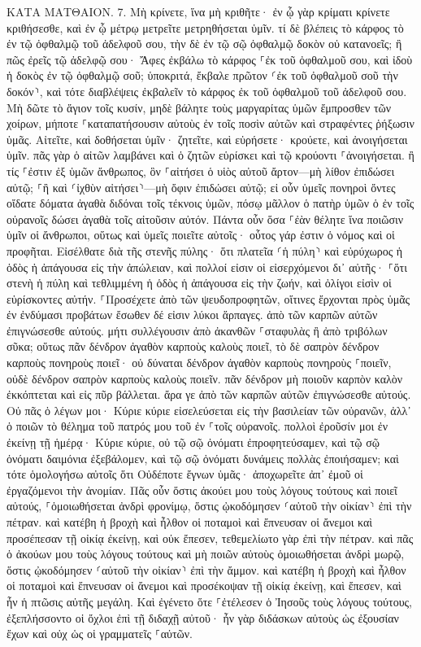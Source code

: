 \documentclass[twoside, 9pt]{extreport}
\begin{document}
ΚΑΤΑ ΜΑΤΘΑΙΟΝ.
7.
Μὴ κρίνετε, ἵνα μὴ κριθῆτε· 
ἐν ᾧ γὰρ κρίματι κρίνετε κριθήσεσθε, καὶ ἐν ᾧ μέτρῳ μετρεῖτε μετρηθήσεται ὑμῖν. 
τί δὲ βλέπεις τὸ κάρφος τὸ ἐν τῷ ὀφθαλμῷ τοῦ ἀδελφοῦ σου, τὴν δὲ ἐν τῷ σῷ ὀφθαλμῷ δοκὸν οὐ κατανοεῖς; 
ἢ πῶς ἐρεῖς τῷ ἀδελφῷ σου· Ἄφες ἐκβάλω τὸ κάρφος ⸀ἐκ τοῦ ὀφθαλμοῦ σου, καὶ ἰδοὺ ἡ δοκὸς ἐν τῷ ὀφθαλμῷ σοῦ; 
ὑποκριτά, ἔκβαλε πρῶτον ⸂ἐκ τοῦ ὀφθαλμοῦ σοῦ τὴν δοκόν⸃, καὶ τότε διαβλέψεις ἐκβαλεῖν τὸ κάρφος ἐκ τοῦ ὀφθαλμοῦ τοῦ ἀδελφοῦ σου. 
Μὴ δῶτε τὸ ἅγιον τοῖς κυσίν, μηδὲ βάλητε τοὺς μαργαρίτας ὑμῶν ἔμπροσθεν τῶν χοίρων, μήποτε ⸀καταπατήσουσιν αὐτοὺς ἐν τοῖς ποσὶν αὐτῶν καὶ στραφέντες ῥήξωσιν ὑμᾶς. 
Αἰτεῖτε, καὶ δοθήσεται ὑμῖν· ζητεῖτε, καὶ εὑρήσετε· κρούετε, καὶ ἀνοιγήσεται ὑμῖν. 
πᾶς γὰρ ὁ αἰτῶν λαμβάνει καὶ ὁ ζητῶν εὑρίσκει καὶ τῷ κρούοντι ⸀ἀνοιγήσεται. 
ἢ τίς ⸀ἐστιν ἐξ ὑμῶν ἄνθρωπος, ὃν ⸀αἰτήσει ὁ υἱὸς αὐτοῦ ἄρτον—μὴ λίθον ἐπιδώσει αὐτῷ; 
⸀ἢ καὶ ⸂ἰχθὺν αἰτήσει⸃—μὴ ὄφιν ἐπιδώσει αὐτῷ; 
εἰ οὖν ὑμεῖς πονηροὶ ὄντες οἴδατε δόματα ἀγαθὰ διδόναι τοῖς τέκνοις ὑμῶν, πόσῳ μᾶλλον ὁ πατὴρ ὑμῶν ὁ ἐν τοῖς οὐρανοῖς δώσει ἀγαθὰ τοῖς αἰτοῦσιν αὐτόν. 
Πάντα οὖν ὅσα ⸀ἐὰν θέλητε ἵνα ποιῶσιν ὑμῖν οἱ ἄνθρωποι, οὕτως καὶ ὑμεῖς ποιεῖτε αὐτοῖς· οὗτος γάρ ἐστιν ὁ νόμος καὶ οἱ προφῆται. 
Εἰσέλθατε διὰ τῆς στενῆς πύλης· ὅτι πλατεῖα ⸂ἡ πύλη⸃ καὶ εὐρύχωρος ἡ ὁδὸς ἡ ἀπάγουσα εἰς τὴν ἀπώλειαν, καὶ πολλοί εἰσιν οἱ εἰσερχόμενοι δι᾽ αὐτῆς· 
⸀ὅτι στενὴ ἡ πύλη καὶ τεθλιμμένη ἡ ὁδὸς ἡ ἀπάγουσα εἰς τὴν ζωήν, καὶ ὀλίγοι εἰσὶν οἱ εὑρίσκοντες αὐτήν. 
⸀Προσέχετε ἀπὸ τῶν ψευδοπροφητῶν, οἵτινες ἔρχονται πρὸς ὑμᾶς ἐν ἐνδύμασι προβάτων ἔσωθεν δέ εἰσιν λύκοι ἅρπαγες. 
ἀπὸ τῶν καρπῶν αὐτῶν ἐπιγνώσεσθε αὐτούς. μήτι συλλέγουσιν ἀπὸ ἀκανθῶν ⸀σταφυλὰς ἢ ἀπὸ τριβόλων σῦκα; 
οὕτως πᾶν δένδρον ἀγαθὸν καρποὺς καλοὺς ποιεῖ, τὸ δὲ σαπρὸν δένδρον καρποὺς πονηροὺς ποιεῖ· 
οὐ δύναται δένδρον ἀγαθὸν καρποὺς πονηροὺς ⸀ποιεῖν, οὐδὲ δένδρον σαπρὸν καρποὺς καλοὺς ποιεῖν. 
πᾶν δένδρον μὴ ποιοῦν καρπὸν καλὸν ἐκκόπτεται καὶ εἰς πῦρ βάλλεται. 
ἄρα γε ἀπὸ τῶν καρπῶν αὐτῶν ἐπιγνώσεσθε αὐτούς. 
Οὐ πᾶς ὁ λέγων μοι· Κύριε κύριε εἰσελεύσεται εἰς τὴν βασιλείαν τῶν οὐρανῶν, ἀλλ᾽ ὁ ποιῶν τὸ θέλημα τοῦ πατρός μου τοῦ ἐν ⸀τοῖς οὐρανοῖς. 
πολλοὶ ἐροῦσίν μοι ἐν ἐκείνῃ τῇ ἡμέρᾳ· Κύριε κύριε, οὐ τῷ σῷ ὀνόματι ἐπροφητεύσαμεν, καὶ τῷ σῷ ὀνόματι δαιμόνια ἐξεβάλομεν, καὶ τῷ σῷ ὀνόματι δυνάμεις πολλὰς ἐποιήσαμεν; 
καὶ τότε ὁμολογήσω αὐτοῖς ὅτι Οὐδέποτε ἔγνων ὑμᾶς· ἀποχωρεῖτε ἀπ᾽ ἐμοῦ οἱ ἐργαζόμενοι τὴν ἀνομίαν. 
Πᾶς οὖν ὅστις ἀκούει μου τοὺς λόγους τούτους καὶ ποιεῖ αὐτούς, ⸀ὁμοιωθήσεται ἀνδρὶ φρονίμῳ, ὅστις ᾠκοδόμησεν ⸂αὐτοῦ τὴν οἰκίαν⸃ ἐπὶ τὴν πέτραν. 
καὶ κατέβη ἡ βροχὴ καὶ ἦλθον οἱ ποταμοὶ καὶ ἔπνευσαν οἱ ἄνεμοι καὶ προσέπεσαν τῇ οἰκίᾳ ἐκείνῃ, καὶ οὐκ ἔπεσεν, τεθεμελίωτο γὰρ ἐπὶ τὴν πέτραν. 
καὶ πᾶς ὁ ἀκούων μου τοὺς λόγους τούτους καὶ μὴ ποιῶν αὐτοὺς ὁμοιωθήσεται ἀνδρὶ μωρῷ, ὅστις ᾠκοδόμησεν ⸂αὐτοῦ τὴν οἰκίαν⸃ ἐπὶ τὴν ἄμμον. 
καὶ κατέβη ἡ βροχὴ καὶ ἦλθον οἱ ποταμοὶ καὶ ἔπνευσαν οἱ ἄνεμοι καὶ προσέκοψαν τῇ οἰκίᾳ ἐκείνῃ, καὶ ἔπεσεν, καὶ ἦν ἡ πτῶσις αὐτῆς μεγάλη. 
Καὶ ἐγένετο ὅτε ⸀ἐτέλεσεν ὁ Ἰησοῦς τοὺς λόγους τούτους, ἐξεπλήσσοντο οἱ ὄχλοι ἐπὶ τῇ διδαχῇ αὐτοῦ· 
ἦν γὰρ διδάσκων αὐτοὺς ὡς ἐξουσίαν ἔχων καὶ οὐχ ὡς οἱ γραμματεῖς ⸀αὐτῶν. 
\end{document}
